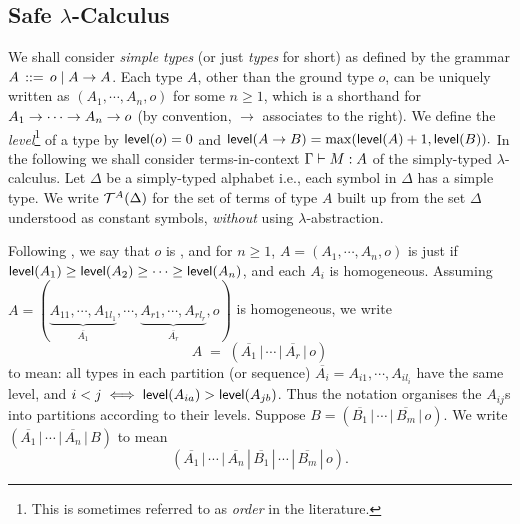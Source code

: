 \subsection{Safe $\lambda$-Calculus}
We shall consider \emph{simple types} (or just \emph{types} for
short) as defined by the grammar $A \, ::= \, o \; | \; A \rightarrow
A$. Each type $A$, other than the ground type $o$, can be uniquely
written as $(A_1, \cdots, A_n, o)$ for some $n \geq 1$, which is a
shorthand for $A_1 \rightarrow \cdots \rightarrow A_n \rightarrow o$ (by
convention, $\rightarrow$ associates to the right). We define the
\emph{level}\footnote{This is sometimes referred to as
\emph{order} in the literature.} of a type by ${\sf level}(o) = 0$ and
${\sf level}(A \rightarrow B) = \max({\sf level}(A)+1, {\sf level}(B)).$ In the
following we shall consider terms-in-context ${{\Gamma} \vdash {M : A}}$
of the simply-typed $\lambda$-calculus. Let $\Delta$ be a simply-typed
alphabet i.e., each symbol in $\Delta$ has a simple type. We
write ${\cal T}^{A}(\Delta)$ for the set of terms of type $A$ built
up from the set $\Delta$ understood as constant symbols,
\emph{without} using $\lambda$-abstraction.

Following \cite{KNU02}, we say that $o$ is ,
and for $n \geq 1$, $A = (A_1, \cdots, A_n, o)$ is
 just if ${\sf level}(A_1) \geq {\sf level}(A_2) \geq
\cdots \geq {\sf level}(A_n)$, and each $A_i$ is homogeneous. Assuming
$A = (\underbrace{A_{11}, \cdots, A_{1l_1}}_{\overline{A_1}},
\cdots, \underbrace{A_{r1}, \cdots, A_{rl_r}}_{\overline{A_r}},
o)$ is homogeneous, we write
\[A \; = \;
(\overline{A_1} \, | \, \cdots \, | \, \overline{A_r} \, | \, o)\]
to mean: all types in each partition (or sequence) $\overline{A_i}
= A_{i1}, \cdots, A_{il_i}$ have the same level, and $i < j \iff
{\sf level}(A_{ia})> {\sf level}(A_{jb})$. Thus the notation organises the
$A_{ij}$s into partitions according to their levels. Suppose $B =
(\overline{B_1} \, | \, \cdots \, | \, \overline{B_m} \, | \, o)$.
We write $(\overline{A_1} \, | \, \cdots \, | \, \overline{A_n} \,
| \, {B})$ to mean \[(\overline{A_1} \, | \, \cdots \, | \,
\overline{A_n} \, | \, \overline{B_1} \, | \, \cdots \, | \,
\overline{B_m} \, | \, o).\]

